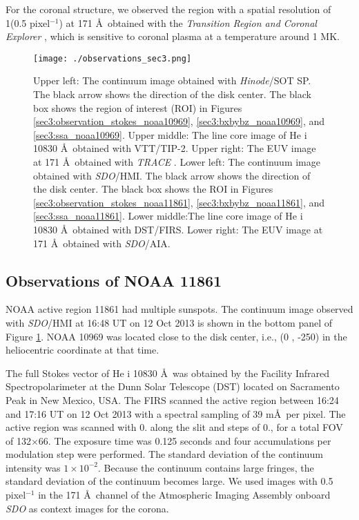 \documentclass[manuscript]{aastex61}
\begin{document}
For the coronal structure, we observed the region with a spatial resolution of 1\arcsec (0\arcsec.5 pixel$^{-1}$) at 171
\AA\ obtained with the {\it Transition Region and Coronal Explorer} \citep[{\it
TRACE};][]{1999SoPh..187..229H}, which is sensitive to coronal plasma at
a temperature around 1 MK. 

 
\begin{figure}
\texttt{[image: ./observations\_sec3.png]}
\caption{Upper left: The continuum image obtained with {\it Hinode}/SOT SP. The black arrow shows the direction of the disk center. The black box shows the region of interest (ROI) in Figures \ref{sec3:observation_stokes_noaa10969}, \ref{sec3:bxbybz_noaa10969}, and \ref{sec3:ssa_noaa10969}. Upper middle: The line core image of  He {\sc i} 10830 \AA \ obtained with VTT/TIP-2. Upper right: The EUV image at 171 \AA \ obtained with {\it TRACE} . Lower left: The continuum image obtained with {\it SDO}/HMI. The black arrow shows the direction of the disk center. The black box shows the ROI in Figures \ref{sec3:observation_stokes_noaa11861}, \ref{sec3:bxbybz_noaa11861}, and \ref{sec3:ssa_noaa11861}. Lower middle:The line core image of  He {\sc i} 10830 \AA \ obtained with DST/FIRS. Lower right: The EUV image at 171 \AA \ obtained with {\it SDO}/AIA.}
\label{sec3:observation}
\end{figure}

\subsection{Observations of NOAA 11861}

NOAA active region 11861 had multiple sunspots. The continuum image observed
with {\it SDO}/HMI at 16:48 UT on 12 Oct 2013 is shown in the bottom panel of
Figure \ref{sec3:observation}. NOAA 10969 was located close to the disk center,
i.e., (0 \arcsec, -250\arcsec) in the heliocentric coordinate at that time. 

 
 The full Stokes vector of He {\sc i} 10830 \AA \ was obtained by the Facility Infrared Spectropolarimeter \citep[FIRS;][]{2010MmSAI..81..763J} at the Dunn Solar Telescope (DST) located on Sacramento Peak in New Mexico, USA. 
 The FIRS scanned the active region between 16:24 and 17:16 UT on 12 Oct 2013 with a spectral sampling of 39 m\AA \ per pixel. 
 The active region was scanned with 0. along the slit and
 steps of 0., for a total FOV of 132\arcsec$\times$66\arcsec. The exposure time
 was 0.125 seconds and four accumulations per modulation step were performed.
 The standard deviation of the continuum intensity was $1\times10^{-2}$. 
 Because the continuum contains large fringes, the standard deviation of the continuum becomes large.
 We used images with 0\arcsec.5 pixel$^{-1}$ in the 171 \AA\ channel of 
 the Atmospheric Imaging Assembly \citep[AIA;][] {2012SoPh..275...17L} onboard 
 {\it SDO} as context images for the corona.
\end{document}
